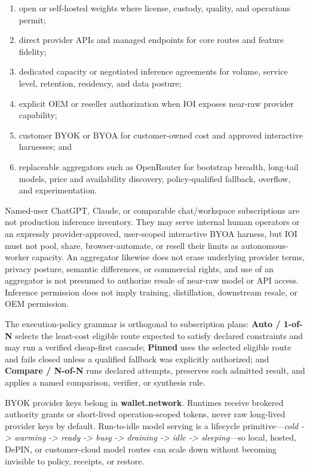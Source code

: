 \documentclass[
  11pt,
]{article}
\providecommand{\tightlist}{%
  \setlength{\itemsep}{0pt}\setlength{\parskip}{0pt}}
\begin{document}
\begin{enumerate}
\def\labelenumi{\arabic{enumi}.}
\tightlist
\item
  open or self-hosted weights where license, custody, quality, and
  operations permit;
\item
  direct provider APIs and managed endpoints for core routes and feature
  fidelity;
\item
  dedicated capacity or negotiated inference agreements for volume,
  service level, retention, residency, and data posture;
\item
  explicit OEM or reseller authorization when IOI exposes near-raw
  provider capability;
\item
  customer BYOK or BYOA for customer-owned cost and approved interactive
  harnesses; and
\item
  replaceable aggregators such as OpenRouter for bootstrap breadth,
  long-tail models, price and availability discovery, policy-qualified
  fallback, overflow, and experimentation.
\end{enumerate}

Named-user ChatGPT, Claude, or comparable chat/workspace subscriptions
are not production inference inventory. They may serve internal human
operators or an expressly provider-approved, user-scoped interactive
BYOA harness, but IOI must not pool, share, browser-automate, or resell
their limits as autonomous-worker capacity. An aggregator likewise does
not erase underlying provider terms, privacy posture, semantic
differences, or commercial rights, and use of an aggregator is not presumed
to authorize resale of near-raw model or API access. Inference permission
does not imply training, distillation, downstream resale, or OEM permission.

The execution-policy grammar is orthogonal to subscription plans:
\textbf{Auto / 1-of-N} selects the least-cost eligible route expected to
satisfy declared constraints and may run a verified cheap-first cascade;
\textbf{Pinned} uses the selected eligible route and fails closed unless
a qualified fallback was explicitly authorized; and \textbf{Compare /
N-of-N} runs declared attempts, preserves each admitted result, and
applies a named comparison, verifier, or synthesis rule.

BYOK provider keys belong in \textbf{wallet.network}. Runtimes receive
brokered authority grants or short-lived operation-scoped tokens, never
raw long-lived provider keys by default. Run-to-idle model serving is a
lifecycle primitive---\emph{cold -> warming -> ready -> busy -> draining
-> idle -> sleeping}---so local, hosted, DePIN, or customer-cloud model
routes can scale down without becoming invisible to policy, receipts, or
restore.
\end{document}
